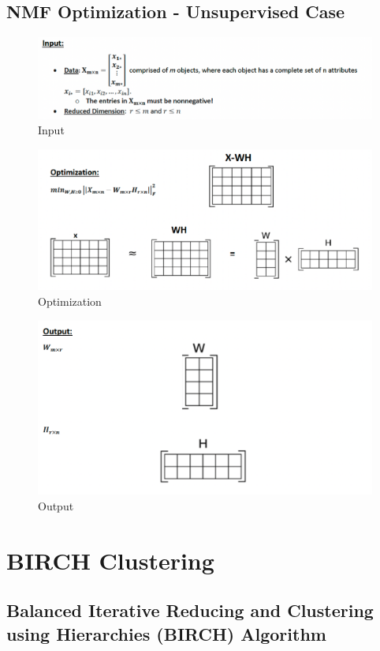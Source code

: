 \documentclass[11pt]{elegantbook}
\begin{document}
\section{NMF Optimization - Unsupervised Case}
\begin{center}\begin{figure}[htbp]
    \centering
    \includegraphics[scale=0.45]{NMF input.png}
    \caption{Input}
    \label{}
\end{figure}\end{center}
\begin{center}\begin{figure}[htbp]
    \centering
    \includegraphics[scale=0.45]{NMF opt.png}
    \caption{Optimization}
    \label{}
\end{figure}\end{center}
\begin{center}\begin{figure}[htbp]
    \centering
    \includegraphics[scale=0.45]{NMF output.png}
    \caption{Output}
    \label{}
\end{figure}\end{center}


\chapter{BIRCH Clustering}
\section{Balanced Iterative Reducing and Clustering using Hierarchies (BIRCH) Algorithm}
\end{document}
